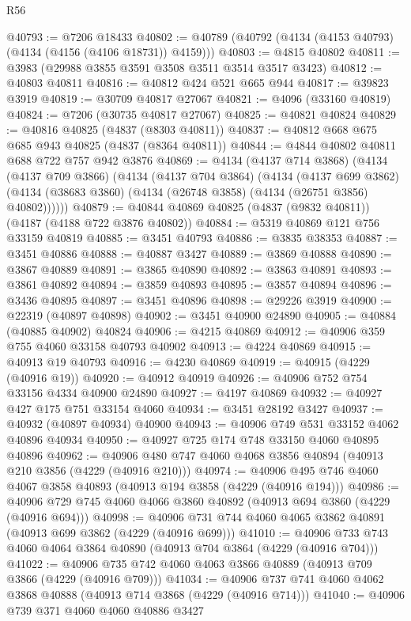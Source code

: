 \begin{lexlean}{R56}
\begin{coremodule}
@40793 := @7206 @18433
@40802 := @40789 (@40792 (@4134 (@4153 @40793) (@4134 (@4156 (@4106 @18731)) @4159)))
@40803 := @4815 @40802
@40811 := @3983 (@29988 @3855 @3591 @3508 @3511 @3514 @3517 @3423)
@40812 := @40803 @40811
@40816 := @40812 @424 @521 @665 @944
@40817 := @39823 @3919
@40819 := @30709 @40817 @27067
@40821 := @4096 (@33160 @40819)
@40824 := @7206 (@30735 @40817 @27067)
@40825 := @40821 @40824
@40829 := @40816 @40825 (@4837 (@8303 @40811))
@40837 := @40812 @668 @675 @685 @943 @40825 (@4837 (@8364 @40811))
@40844 := @4844 @40802 @40811 @688 @722 @757 @942 @3876
@40869 := @4134
    (@4137 @714 @3868)
    (@4134
      (@4137 @709 @3866)
      (@4134
        (@4137 @704 @3864)
        (@4134
          (@4137 @699 @3862)
          (@4134 (@38683 @3860) (@4134 (@26748 @3858) (@4134 (@26751 @3856) @40802))))))
@40879 := @40844 @40869 @40825 (@4837 (@9832 @40811)) (@4187 (@4188 @722 @3876 @40802))
@40884 := @5319 @40869 @121 @756 @33159 @40819
@40885 := @3451 @40793
@40886 := @3835 @38353
@40887 := @3451 @40886
@40888 := @40887 @3427
@40889 := @3869 @40888
@40890 := @3867 @40889
@40891 := @3865 @40890
@40892 := @3863 @40891
@40893 := @3861 @40892
@40894 := @3859 @40893
@40895 := @3857 @40894
@40896 := @3436 @40895
@40897 := @3451 @40896
@40898 := @29226 @3919
@40900 := @22319 (@40897 @40898)
@40902 := @3451 @40900 @24890
@40905 := @40884 (@40885 @40902) @40824
@40906 := @4215 @40869
@40912 := @40906 @359 @755 @4060 @33158 @40793 @40902
@40913 := @4224 @40869
@40915 := @40913 @19 @40793
@40916 := @4230 @40869
@40919 := @40915 (@4229 (@40916 @19))
@40920 := @40912 @40919
@40926 := @40906 @752 @754 @33156 @4334 @40900 @24890
@40927 := @4197 @40869
@40932 := @40927 @427 @175 @751 @33154 @4060
@40934 := @3451 @28192 @3427
@40937 := @40932 (@40897 @40934) @40900
@40943 := @40906 @749 @531 @33152 @4062 @40896 @40934
@40950 := @40927 @725 @174 @748 @33150 @4060 @40895 @40896
@40962 := @40906 @480 @747 @4060 @4068 @3856 @40894 (@40913 @210 @3856 (@4229 (@40916 @210)))
@40974 := @40906 @495 @746 @4060 @4067 @3858 @40893 (@40913 @194 @3858 (@4229 (@40916 @194)))
@40986 := @40906 @729 @745 @4060 @4066 @3860 @40892 (@40913 @694 @3860 (@4229 (@40916 @694)))
@40998 := @40906 @731 @744 @4060 @4065 @3862 @40891 (@40913 @699 @3862 (@4229 (@40916 @699)))
@41010 := @40906 @733 @743 @4060 @4064 @3864 @40890 (@40913 @704 @3864 (@4229 (@40916 @704)))
@41022 := @40906 @735 @742 @4060 @4063 @3866 @40889 (@40913 @709 @3866 (@4229 (@40916 @709)))
@41034 := @40906 @737 @741 @4060 @4062 @3868 @40888 (@40913 @714 @3868 (@4229 (@40916 @714)))
@41040 := @40906 @739 @371 @4060 @4060 @40886 @3427

\end{coremodule}
\end{lexlean}
